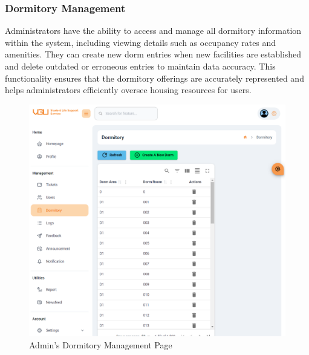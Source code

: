 	\subsubsection{Dormitory Management}
	Administrators have the ability to access and manage all dormitory information within the system, including viewing details such as occupancy rates and amenities. They can create new dorm entries when new facilities are established and delete outdated or erroneous entries to maintain data accuracy. This functionality ensures that the dormitory offerings are accurately represented and helps administrators efficiently oversee housing resources for users.
	\begin{figure}[H]
		\centering
		\includegraphics[width=0.9\linewidth]{graphics/gui/admin/dorm-mng}
		\caption{Admin's Dormitory Management Page}
		\label{fig:gui-ad-dorm-mng}
	\end{figure}
	
	
